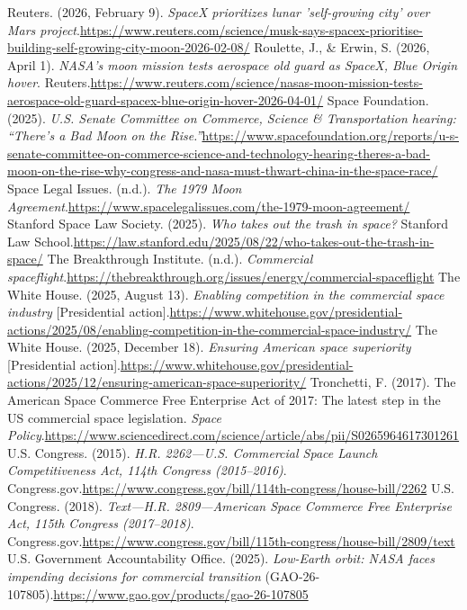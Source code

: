 \begin{referencelist}
   Reuters. (2026, February 9). \emph{SpaceX prioritizes lunar 'self-growing city' over Mars project}.\url{https://www.reuters.com/science/musk-says-spacex-prioritise-building-self-growing-city-moon-2026-02-08/}
   Roulette, J., \& Erwin, S. (2026, April 1). \emph{NASA's moon mission tests aerospace old guard as SpaceX, Blue Origin hover}. Reuters.\url{https://www.reuters.com/science/nasas-moon-mission-tests-aerospace-old-guard-spacex-blue-origin-hover-2026-04-01/}
   Space Foundation. (2025). \emph{U.S. Senate Committee on Commerce, Science \& Transportation hearing: “There's a Bad Moon on the Rise.”}\url{https://www.spacefoundation.org/reports/u-s-senate-committee-on-commerce-science-and-technology-hearing-theres-a-bad-moon-on-the-rise-why-congress-and-nasa-must-thwart-china-in-the-space-race/}
   Space Legal Issues. (n.d.). \emph{The 1979 Moon Agreement}.\url{https://www.spacelegalissues.com/the-1979-moon-agreement/}
   Stanford Space Law Society. (2025). \emph{Who takes out the trash in space?} Stanford Law School.\url{https://law.stanford.edu/2025/08/22/who-takes-out-the-trash-in-space/}
   The Breakthrough Institute. (n.d.). \emph{Commercial spaceflight}.\url{https://thebreakthrough.org/issues/energy/commercial-spaceflight}
   The White House. (2025, August 13). \emph{Enabling competition in the commercial space industry} [Presidential action].\url{https://www.whitehouse.gov/presidential-actions/2025/08/enabling-competition-in-the-commercial-space-industry/}
   The White House. (2025, December 18). \emph{Ensuring American space superiority} [Presidential action].\url{https://www.whitehouse.gov/presidential-actions/2025/12/ensuring-american-space-superiority/}
   Tronchetti, F. (2017). The American Space Commerce Free Enterprise Act of 2017: The latest step in the US commercial space legislation. \emph{Space Policy}.\url{https://www.sciencedirect.com/science/article/abs/pii/S0265964617301261}
   U.S. Congress. (2015). \emph{H.R. 2262—U.S. Commercial Space Launch Competitiveness Act, 114th Congress (2015–2016)}. Congress.gov.\url{https://www.congress.gov/bill/114th-congress/house-bill/2262}
   U.S. Congress. (2018). \emph{Text—H.R. 2809—American Space Commerce Free Enterprise Act, 115th Congress (2017–2018)}. Congress.gov.\url{https://www.congress.gov/bill/115th-congress/house-bill/2809/text}
   U.S. Government Accountability Office. (2025). \emph{Low-Earth orbit: NASA faces impending decisions for commercial transition} (GAO-26-107805).\url{https://www.gao.gov/products/gao-26-107805}

\end{referencelist}
